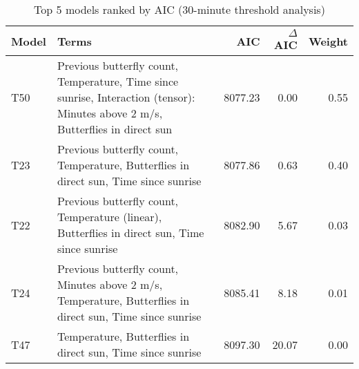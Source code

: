 \begin{table}

\caption{\label{tab:threshold_model_selection}Top 5 models ranked by AIC (30-minute threshold analysis)}
\centering
\begin{tabular}[t]{llrrr}
\toprule
Model & Terms & AIC & $\Delta$AIC & Weight\\
\midrule
T50 & Previous butterfly count, Temperature, Time since sunrise, Interaction (tensor): Minutes above 2 m/s, Butterflies in direct sun & 8077.23 & 0.00 & 0.55\\
T23 & Previous butterfly count, Temperature, Butterflies in direct sun, Time since sunrise & 8077.86 & 0.63 & 0.40\\
T22 & Previous butterfly count, Temperature (linear), Butterflies in direct sun, Time since sunrise & 8082.90 & 5.67 & 0.03\\
T24 & Previous butterfly count, Minutes above 2 m/s, Temperature, Butterflies in direct sun, Time since sunrise & 8085.41 & 8.18 & 0.01\\
T47 & Temperature, Butterflies in direct sun, Time since sunrise & 8097.30 & 20.07 & 0.00\\
\bottomrule
\end{tabular}
\end{table}
